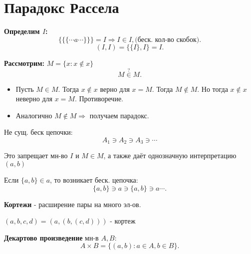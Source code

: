 \section{Парадокс Рассела}
\textbf{Определим $I$:}
\[
\{\{\{\cdots a\cdots \}\}\} = I \Rightarrow I \in I, \text{(беск. кол-во скобок)}
.\] 
\[
    (I, I) = \{\{I\}, I\} = I
.\] 

\textbf{Рассмотрим:} $M = \{x \colon x \not\in x\}$
\[
    M \overset{\text{?}}{\in } M
.\] 
\begin{itemize}
    \item Пусть $M \in M$. Тогда $x \not\in x$ верно для $x = M$. Тогда $M \not\in M$. Но тогда $x \not\in x$ неверно для $x = M$. Противоречие.
    \item Аналогично  $M \not\in M \Rightarrow $ получаем парадокс.
\end{itemize}

\begin{axiom} 
    Не сущ. беск цепочки:
    \[
        A_1 \ni A_2 \ni A_3 \ni \cdots
    \]
\end{axiom}
\begin{note}
Это запрещает мн-во $I \text{ и } M \in M$, а также даёт однозначную интерпретацию $(a, b)$ 

Если $\{a, b\} \in a$, то возникает беск. цепочка:
\[
\{a, b\} \ni a \ni \{a, b\} \ni a \cdots 
.\] 
\end{note}

\begin{definition}
\textbf{Кортежи} - расширение пары на много эл-ов.
\begin{example}
$(a, b, c, d) = (a, (b, (c, d)))$ - кортеж
\end{example}

\begin{definition}
\textbf{Декартово произведение} мн-в $A, B$:
 \[
A\times B = \{(a, b) \colon a \in A, b \in B\}
.\] 
\end{definition}


\end{definition}

